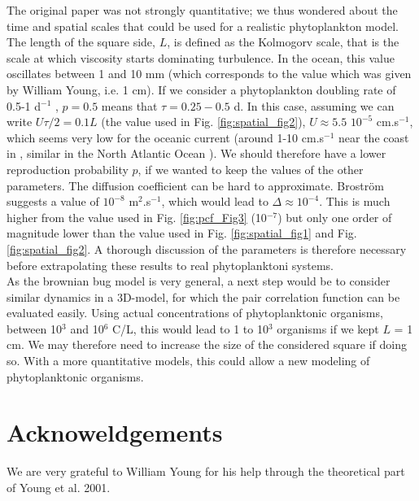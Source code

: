 The original paper was not strongly quantitative; we thus wondered about the time and spatial scales that could be used for a realistic phytoplankton model. The length of the square side, $L$, is defined as the Kolmogorv scale, that is the scale at which viscosity starts dominating turbulence. In the ocean, this value oscillates between 1 and 10 mm \citep{barton_impact_2014} (which corresponds to the value which was given by William Young, i.e. 1 cm). If we consider a phytoplankton doubling rate of 0.5-1 d$^{-1}$ \citep{bissinger_predicting_2008}, $p=0.5$ means that $\tau=0.25 - 0.5$ d. In this case, assuming we can write $U\tau/2=0.1L$ (the value used in Fig. \ref{fig:spatial_fig2}), $U\approx 5.5$ $10^{-5}$ cm.s$^{-1}$, which seems very low for the oceanic current (around 1-10 cm.s$^{-1}$ near the coast in \cite{font-munoz_advection_2017}, similar in the North Atlantic Ocean \citep{flatau_north_2003}). We should therefore have a lower reproduction probability $p$, if we wanted to keep the values of the other parameters. The diffusion coefficient can be hard to approximate. Brostr\"om \citep{brostrom_advection_2002} suggests a value of $10^{-8}$ m$^{2}$.s$^{-1}$, which would lead to $\Delta \approx 10^{-4}$. This is much higher from the value used in Fig. \ref{fig:pcf_Fig3} (10$^{-7}$) but only one order of magnitude lower than the value used in Fig. \ref{fig:spatial_fig1} and Fig. \ref{fig:spatial_fig2}. A thorough discussion of the parameters is therefore necessary before extrapolating these results to real phytoplanktoni systems. \\

As the brownian bug model is very general, a next step would be to consider similar dynamics in a 3D-model, for which the pair correlation function can be evaluated easily. Using actual concentrations of phytoplanktonic organisms, between 10$^3$ and 10$^6$ C/L, this would lead to 1 to 10$^3$ organisms if we kept $L$ = 1 cm. We may therefore need to increase the size of the considered square if doing so. With a more quantitative models, this could allow a new modeling of phytoplanktonic organisms. 






\section*{Acknoweldgements}
We are very grateful to William Young for his help through the theoretical part of Young et al. 2001. 
